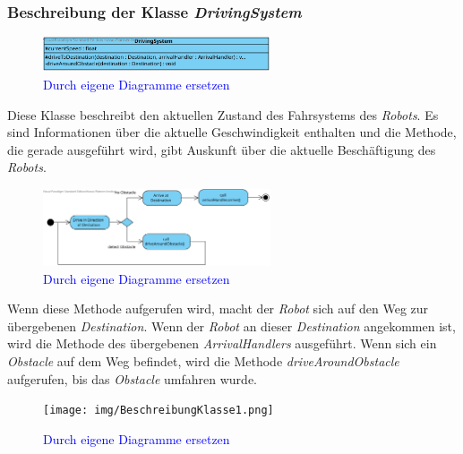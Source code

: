 	\subsubsection{Beschreibung der Klasse \textit{DrivingSystem}}
		\begin{figure}[H]
		\centering
		\includegraphics[width=0.6\textwidth]{../images/Iteration0_Entwurf_7-1-2_Klasse_DrivingSystem.svg}
		\caption{\textcolor{blue}{Durch eigene Diagramme ersetzen}}
		\label{BeschreibungKlasse1}
		\end{figure}
		
		Diese Klasse beschreibt den aktuellen Zustand des Fahrsystems des \textit{Robots}. 
		Es sind Informationen über die aktuelle Geschwindigkeit enthalten und die Methode, 
		die gerade ausgeführt wird, gibt Auskunft über die aktuelle Beschäftigung des \textit{Robots}.

			\begin{figure}[H]
			\centering
			\includegraphics[width=0.6\textwidth]{../images/Iteration0_Entwurf_7-1-2-1_Methode_driveToDestination.svg}
			\caption{\textcolor{blue}{Durch eigene Diagramme ersetzen}}
			\label{BeschreibungKlasse1}
			\end{figure}

			Wenn diese Methode aufgerufen wird, macht der \textit{Robot} sich auf den Weg zur 
			übergebenen \textit{Destination}. Wenn der \textit{Robot} an dieser \textit{Destination} 
			angekommen ist, wird die Methode des übergebenen \textit{ArrivalHandlers} ausgeführt. 
			Wenn sich ein \textit{Obstacle} auf dem Weg befindet, wird die Methode \textit{driveAroundObstacle} 
			aufgerufen, bis das \textit{Obstacle} umfahren wurde.

			\begin{figure}[H]
			\centering
			\texttt{[image: img/BeschreibungKlasse1.png]}
			\caption{\textcolor{blue}{Durch eigene Diagramme ersetzen}}
			\label{BeschreibungKlasse1}
			\end{figure}

